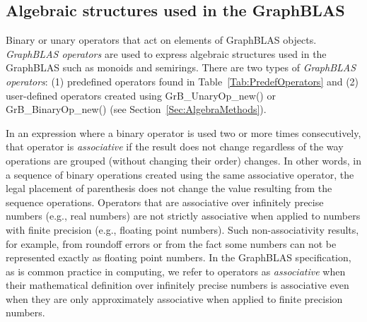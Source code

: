 

\glossEnd



\subsection{Algebraic structures used in the GraphBLAS}

\glossBegin
{} Binary or unary operators that act on elements of GraphBLAS 
objects.  \emph{GraphBLAS operators} are used to express algebraic structures used in the 
GraphBLAS such as monoids and semirings. There are two types of \emph{GraphBLAS operators}: 
(1) predefined operators found in Table~\ref{Tab:PredefOperators} and (2) user-defined 
operators created using {\sf GrB\_UnaryOp\_new()} or {\sf GrB\_BinaryOp\_new()} 
(see Section~\ref{Sec:AlgebraMethods}).

 In an expression where a binary operator is used 
two or more times consecutively, that operator is \emph{associative} if the result 
does not change regardless of the way operations are grouped (without changing their order) 
changes. In other words, in a sequence of binary operations created using the same associative 
operator, the legal placement of parenthesis does not change the value resulting 
from the sequence operations.  Operators that are associative over infinitely 
precise numbers (e.g., real numbers) are not strictly associative when applied to 
numbers with finite precision (e.g., floating point numbers). Such non-associativity 
results, for example, from roundoff errors or from the fact some numbers can not 
be represented exactly as floating point numbers.   In the GraphBLAS specification, 
as is common practice in computing, we refer to operators as \emph{associative} 
when their mathematical definition over infinitely precise numbers is associative 
even when they are only approximately associative when applied to finite precision 
numbers.

